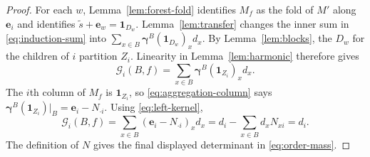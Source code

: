 \documentclass[11pt]{article}
\newcommand{\gam}{\boldsymbol\gamma}
\begin{document}
\begin{proof}
For each $w$, Lemma~\ref{lem:forest-fold} identifies $M_f$ as
the fold of $M'$ along $\mathbf e_i$ and identifies
$\widetilde s+\mathbf e_w=\mathbf1_{D_w}$.
Lemma~\ref{lem:transfer} changes the inner sum in
\eqref{eq:induction-sum} into
$\sum_{x\in B}\gam^B(\mathbf1_{D_w})_x d_x$.
By Lemma~\ref{lem:blocks}, the $D_w$ for the children of $i$
partition $Z_i$. Linearity in Lemma~\ref{lem:harmonic} therefore
gives
\[
\mathcal G_i(B,f)
=\sum_{x\in B}\gam^B(\mathbf1_{Z_i})_x d_x.
\]
The $i$th column of $M_f$ is $\mathbf1_{Z_i}$, so
\eqref{eq:aggregation-column} says
$\gam^B(\mathbf1_{Z_i})|_B=\mathbf e_i-N_{\cdot i}$.
Using \eqref{eq:left-kernel},
\[
\mathcal G_i(B,f)
=\sum_{x\in B}(\mathbf e_i-N_{\cdot i})_x d_x
=d_i-\sum_{x\in B}d_xN_{xi}=d_i.
\]
The definition of $N$ gives the final displayed determinant in
\eqref{eq:order-mass}.
\end{proof}
\end{document}
